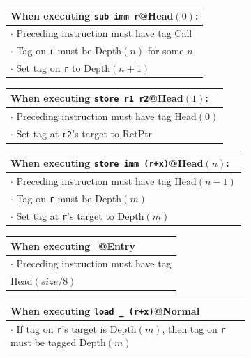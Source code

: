 \documentclass{report}
\begin{document}
\begin{figure}
  \begin{subfigure}{\textwidth}
    \begin{tabular}{|l|}
      \hline
      When executing {\tt sub imm r}@{\sc Head}\((0)\): \\
      \hline
      \rowcolor{red!20}
      \(\cdot\) Preceding instruction must have tag {\sc Call} \\
      \rowcolor{blue!30}
      \(\cdot\) Tag on {\tt r} must be {\sc Depth}\((n)\) for some \(n\) \\
      \rowcolor{blue!30}
      \(\cdot\) Set tag on {\tt r} to {\sc Depth}\((n+1)\) \\
      \hline
    \end{tabular}
   \begin{tabular}{|l|}
      \hline
      When executing {\tt store r1 r2}@{\sc Head}\((1)\): \\
      \hline
      \rowcolor{red!20}
      \(\cdot\) Preceding instruction must have tag {\sc Head}\((0)\) \\
      \rowcolor{red!20}
      \(\cdot\) Set tag at {\tt r2}'s target to {\sc RetPtr} \\
      \hline
    \end{tabular}
    
    \begin{tabular}{|l|}
      \hline
      When executing {\tt store imm (r+x)}@{\sc Head}\((n)\): \\
      \hline
      \rowcolor{red!20}
      \(\cdot\) Preceding instruction must have tag {\sc Head}\((n-1)\) \\
      \rowcolor{blue!30}
      \(\cdot\) Tag on {\tt r} must be {\sc Depth}\((m)\) \\
      \rowcolor{blue!30}
      \(\cdot\) Set tag at {\tt r}'s target to {\sc Depth}\((m)\) \\
      \hline
    \end{tabular}
    \begin{tabular}{|l|}
      \hline
      When executing \(\underline{~~}\)@{\sc Entry} \\
      \hline
      \rowcolor{red!20}
      \(\cdot\) Preceding instruction must have tag \\
      \rowcolor{red!20} {\sc Head}\((size / 8)\) \\
      \hline
    \end{tabular}
    
    \begin{tabular}{|l|}
      \hline
      When executing {\tt load \_ (r+x)}@{\sc Normal} \\
      \hline
      \rowcolor{blue!30}
      \(\cdot\) If tag on {\tt r}'s target is {\sc Depth}\((m)\), then
      tag on {\tt r} must be tagged {\sc Depth}\((m)\) \\
      \hline
    \end{tabular}
    

\end{subfigure}
\end{figure}
\end{document}
